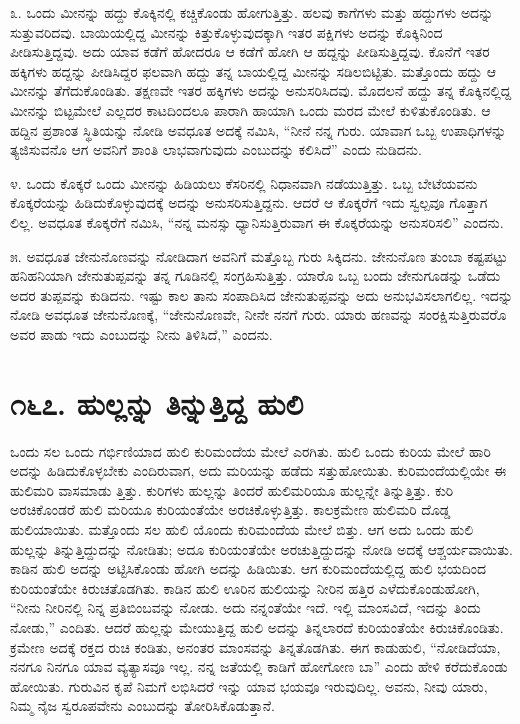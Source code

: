 ೩. ಒಂದು ಮೀನನ್ನು ಹದ್ದು ಕೊಕ್ಕಿನಲ್ಲಿ ಕಚ್ಚಿಕೊಂಡು ಹೋಗುತ್ತಿತ್ತು. ಹಲವು ಕಾಗೆಗಳು ಮತ್ತು ಹದ್ದುಗಳು ಅದನ್ನು ಸುತ್ತುವರಿದವು. ಬಾಯಿಯಲ್ಲಿದ್ದ ಮೀನನ್ನು ಕಿತ್ತುಕೊಳ್ಳುವುದಕ್ಕಾಗಿ ಇತರ ಪಕ್ಷಿಗಳು ಅದನ್ನು ಕೊಕ್ಕಿನಿಂದ ಪೀಡಿಸುತ್ತಿದ್ದವು. ಅದು ಯಾವ ಕಡೆಗೆ ಹೋದರೂ ಆ ಕಡೆಗೆ ಹೋಗಿ ಆ ಹದ್ದನ್ನು ಪೀಡಿಸುತ್ತಿದ್ದವು. ಕೊನೆಗೆ ಇತರ ಹಕ್ಕಿಗಳು ಹದ್ದನ್ನು ಪೀಡಿಸಿದ್ದರ ಫಲವಾಗಿ ಹದ್ದು ತನ್ನ ಬಾಯಲ್ಲಿದ್ದ ಮೀನನ್ನು ಸಡಿಲಬಿಟ್ಟಿತು. ಮತ್ತೊಂದು ಹದ್ದು ಆ ಮೀನನ್ನು ತೆಗೆದುಕೊಂಡಿತು. ತಕ್ಷಣವೇ ಇತರ ಹಕ್ಕಿಗಳು ಅದನ್ನು ಅನುಸರಿಸಿದವು. ಮೊದಲನೆ ಹದ್ದು ತನ್ನ ಕೊಕ್ಕಿನಲ್ಲಿದ್ದ ಮೀನನ್ನು ಬಿಟ್ಟಮೇಲೆ ಎಲ್ಲದರ ಕಾಟದಿಂದಲೂ ಪಾರಾಗಿ ಹಾಯಾಗಿ ಒಂದು ಮರದ ಮೇಲೆ ಕುಳಿತುಕೊಂಡಿತು. ಆ ಹದ್ದಿನ ಪ್ರಶಾಂತ ಸ್ಥಿತಿಯನ್ನು ನೋಡಿ ಅವಧೂತ ಅದಕ್ಕೆ ನಮಿಸಿ, “ನೀನೆ ನನ್ನ ಗುರು. ಯಾವಾಗ ಒಬ್ಬ ಉಪಾಧಿಗಳನ್ನು ತ್ಯಜಿಸುವನೊ ಆಗ ಅವನಿಗೆ ಶಾಂತಿ ಲಾಭವಾಗುವುದು ಎಂಬುದನ್ನು ಕಲಿಸಿದೆ” ಎಂದು ನುಡಿದನು.

೪. ಒಂದು ಕೊಕ್ಕರೆ ಒಂದು ಮೀನನ್ನು ಹಿಡಿಯಲು ಕೆಸರಿನಲ್ಲಿ ನಿಧಾನವಾಗಿ ನಡೆಯುತ್ತಿತ್ತು. ಒಬ್ಬ ಬೇಟೆಯವನು ಕೊಕ್ಕರೆಯನ್ನು ಹಿಡಿದುಕೊಳ್ಳುವುದಕ್ಕೆ ಅದನ್ನು ಅನುಸರಿಸುತ್ತಿದ್ದನು. ಆದರೆ ಆ ಕೊಕ್ಕರೆಗೆ ಇದು ಸ್ವಲ್ಪವೂ ಗೊತ್ತಾಗ ಲಿಲ್ಲ. ಅವಧೂತ ಕೊಕ್ಕರೆಗೆ ನಮಿಸಿ, “ನನ್ನ ಮನಸ್ಸು ಧ್ಯಾನಿಸುತ್ತಿರುವಾಗ ಈ ಕೊಕ್ಕರೆಯನ್ನು ಅನುಸರಿಸಲಿ” ಎಂದನು.

೫. ಅವಧೂತ ಜೇನುನೊಣವನ್ನು ನೋಡಿದಾಗ ಅವನಿಗೆ ಮತ್ತೊಬ್ಬ ಗುರು ಸಿಕ್ಕಿದನು. ಜೇನುನೊಣ ತುಂಬಾ ಕಷ್ಟಪಟ್ಟು ಹನಿಹನಿಯಾಗಿ ಜೇನುತುಪ್ಪವನ್ನು ತನ್ನ ಗೂಡಿನಲ್ಲಿ ಸಂಗ್ರಹಿಸುತ್ತಿತ್ತು. ಯಾರೊ ಒಬ್ಬ ಬಂದು ಜೇನುಗೂಡನ್ನು ಒಡೆದು ಅದರ ತುಪ್ಪವನ್ನು ಕುಡಿದನು. ಇಷ್ಟು ಕಾಲ ತಾನು ಸಂಪಾದಿಸಿದ ಜೇನುತುಪ್ಪವನ್ನು ಅದು ಅನುಭವಿಸಲಾಗಲಿಲ್ಲ. ಇದನ್ನು ನೋಡಿ ಅವಧೂತ ಜೇನುನೊಣಕ್ಕೆ, “ಜೇನುನೊಣವೇ, ನೀನೇ ನನಗೆ ಗುರು. ಯಾರು ಹಣವನ್ನು ಸಂರಕ್ಷಿಸುತ್ತಿರುವರೊ ಅವರ ಪಾಡು ಇದು ಎಂಬುದನ್ನು ನೀನು ತಿಳಿಸಿದೆ,” ಎಂದನು.


\section{\num{೧೬೭. } ಹುಲ್ಲನ್ನು ತಿನ್ನುತ್ತಿದ್ದ ಹುಲಿ}

ಒಂದು ಸಲ ಒಂದು ಗರ್ಭಿಣಿಯಾದ ಹುಲಿ ಕುರಿಮಂದೆಯ ಮೇಲೆ ಎರಗಿತು. ಹುಲಿ ಒಂದು ಕುರಿಯ ಮೇಲೆ ಹಾರಿ ಅದನ್ನು ಹಿಡಿದುಕೊಳ್ಳಬೇಕು ಎಂದಿರುವಾಗ, ಅದು ಮರಿಯನ್ನು ಹಡೆದು ಸತ್ತುಹೋಯಿತು. ಕುರಿಮಂದೆಯಲ್ಲಿಯೇ ಈ ಹುಲಿಮರಿ ವಾಸಮಾಡು ತ್ತಿತ್ತು. ಕುರಿಗಳು ಹುಲ್ಲನ್ನು ತಿಂದರೆ ಹುಲಿಮರಿಯೂ ಹುಲ್ಲನ್ನೇ ತಿನ್ನುತ್ತಿತ್ತು. ಕುರಿ ಅರಚಿಕೊಂಡರೆ ಹುಲಿ ಮರಿಯೂ ಕುರಿಯಂತೆಯೇ ಅರಚಿಕೊಳ್ಳುತ್ತಿತ್ತು. ಕಾಲಕ್ರಮೇಣ ಹುಲಿಮರಿ ದೊಡ್ಡ ಹುಲಿಯಾಯಿತು. ಮತ್ತೊಂದು ಸಲ ಹುಲಿ ಯೊಂದು ಕುರಿಮಂದೆಯ ಮೇಲೆ ಬಿತ್ತು. ಆಗ ಅದು ಒಂದು ಹುಲಿ ಹುಲ್ಲನ್ನು ತಿನ್ನುತ್ತಿದ್ದುದನ್ನು ನೋಡಿತು; ಅದೂ ಕುರಿಯಂತೆಯೇ ಅರಚುತ್ತಿದ್ದುದನ್ನು ನೋಡಿ ಅದಕ್ಕೆ ಆಶ್ಚರ್ಯವಾಯಿತು. ಕಾಡಿನ ಹುಲಿ ಅದನ್ನು ಅಟ್ಟಿಸಿಕೊಂಡು ಹೋಗಿ ಅದನ್ನು ಹಿಡಿಯಿತು. ಆಗ ಕುರಿಮಂದೆಯಲ್ಲಿದ್ದ ಹುಲಿ ಭಯದಿಂದ ಕುರಿಯಂತೆಯೇ ಕಿರುಚತೊಡಗಿತು. ಕಾಡಿನ ಹುಲಿ ಊರಿನ ಹುಲಿಯನ್ನು ನೀರಿನ ಹತ್ತಿರ ಎಳೆದುಕೊಂಡುಹೋಗಿ, “ನೀನು ನೀರಿನಲ್ಲಿ ನಿನ್ನ ಪ್ರತಿಬಿಂಬವನ್ನು ನೋಡು. ಅದು ನನ್ನಂತೆಯೇ ಇದೆ. ಇಲ್ಲಿ ಮಾಂಸವಿದೆ, ಇದನ್ನು ತಿಂದು ನೋಡು,” ಎಂದಿತು. ಆದರೆ ಹುಲ್ಲನ್ನು ಮೇಯುತ್ತಿದ್ದ ಹುಲಿ ಅದನ್ನು ತಿನ್ನಲಾರದೆ ಕುರಿಯಂತೆಯೇ ಕಿರುಚಿಕೊಂಡಿತು. ಕ್ರಮೇಣ ಅದಕ್ಕೆ ರಕ್ತದ ರುಚಿ ಕಂಡಿತು, ಅನಂತರ ಮಾಂಸವನ್ನು ತಿನ್ನತೊಡಗಿತು. ಈಗ ಕಾಡುಹುಲಿ, “ನೋಡಿದೆಯಾ, ನನಗೂ ನಿನಗೂ ಯಾವ ವ್ಯತ್ಯಾಸವೂ ಇಲ್ಲ. ನನ್ನ ಜತೆಯಲ್ಲಿ ಕಾಡಿಗೆ ಹೋಗೋಣ ಬಾ” ಎಂದು ಹೇಳಿ ಕರೆದುಕೊಂಡು ಹೋಯಿತು. ಗುರುವಿನ ಕೃಪೆ ನಿಮಗೆ ಲಭಿಸಿದರೆ ಇನ್ನು ಯಾವ ಭಯವೂ ಇರುವುದಿಲ್ಲ. ಅವನು, ನೀವು ಯಾರು, ನಿಮ್ಮ ನೈಜ ಸ್ವರೂಪವೇನು ಎಂಬುದನ್ನು ತೋರಿಸಿಕೊಡುತ್ತಾನೆ.


